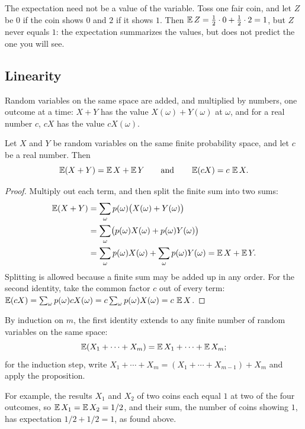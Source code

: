 The expectation need not be a value of the variable. Toss one fair coin, and let $Z$ be $0$ if the coin shows $0$ and $2$ if it shows $1$. Then $\operatorname{\mathbb E} Z=\tfrac12\cdot0+\tfrac12\cdot2=1$, but $Z$ never equals $1$: the expectation summarizes the values, but does not predict the one you will see.

\subsection*{Linearity}
Random variables on the same space are added, and multiplied by numbers, one outcome at a time: $X+Y$ has the value $X(\omega)+Y(\omega)$ at $\omega$, and for a real number $c$, $cX$ has the value $cX(\omega)$.

\par\noindent\begin{minipage}{\linewidth}
\begin{proposition}\label{ch13:prop:linearity}
Let $X$ and $Y$ be random variables on the same finite probability space, and let $c$ be a real number. Then
\[
\operatorname{\mathbb E}(X+Y)=\operatorname{\mathbb E} X+\operatorname{\mathbb E} Y\qquad\text{and}\qquad\operatorname{\mathbb E}(cX)=c\,\operatorname{\mathbb E} X.
\]
\end{proposition}
\end{minipage}\par

\begin{proof}
Multiply out each term, and then split the finite sum into two sums:
\begin{align*}
\operatorname{\mathbb E}(X+Y)&=\sum_\omega p(\omega)\bigl(X(\omega)+Y(\omega)\bigr)\\
&=\sum_\omega\bigl(p(\omega)X(\omega)+p(\omega)Y(\omega)\bigr)\\
&=\sum_\omega p(\omega)X(\omega)+\sum_\omega p(\omega)Y(\omega)=\operatorname{\mathbb E} X+\operatorname{\mathbb E} Y.
\end{align*}
Splitting is allowed because a finite sum may be added up in any order. For the second identity, take the common factor $c$ out of every term: $\operatorname{\mathbb E}(cX)=\sum_\omega p(\omega)cX(\omega)=c\sum_\omega p(\omega)X(\omega)=c\,\operatorname{\mathbb E} X$.
\end{proof}

By induction on $m$, the first identity extends to any finite number of random variables on the same space:
\[
\operatorname{\mathbb E}(X_1+\cdots+X_m)=\operatorname{\mathbb E} X_1+\cdots+\operatorname{\mathbb E} X_m;
\]
for the induction step, write $X_1+\cdots+X_m=(X_1+\cdots+X_{m-1})+X_m$ and apply the proposition.

For example, the results $X_1$ and $X_2$ of two coins each equal $1$ at two of the four outcomes, so $\operatorname{\mathbb E} X_1=\operatorname{\mathbb E} X_2=1/2$, and their sum, the number of coins showing $1$, has expectation $1/2+1/2=1$, as found above.

